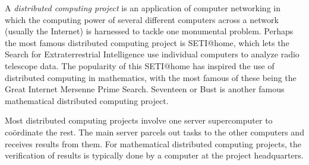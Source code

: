 \documentclass[12pt]{article}
\begin{document}
A {\em distributed computing project} is an application of computer networking in which the computing power of several different computers across a network (usually the Internet) is harnessed to tackle one monumental problem. Perhaps the most famous distributed computing project is SETI@home, which lets the Search for Extraterrestrial Intelligence use individual computers to analyze radio telescope data. The popularity of this SETI@home has inspired the use of distributed computing in mathematics, with the most famous of these being the Great Internet Mersenne Prime Search. Seventeen or Bust is another famous mathematical distributed computing project.

Most distributed computing projects involve one server supercomputer to co\"ordinate the rest. The main server parcels out tasks to the other computers and receives results from them. For mathematical distributed computing projects, the verification of results is typically done by a computer at the project headquarters.
\end{document}

